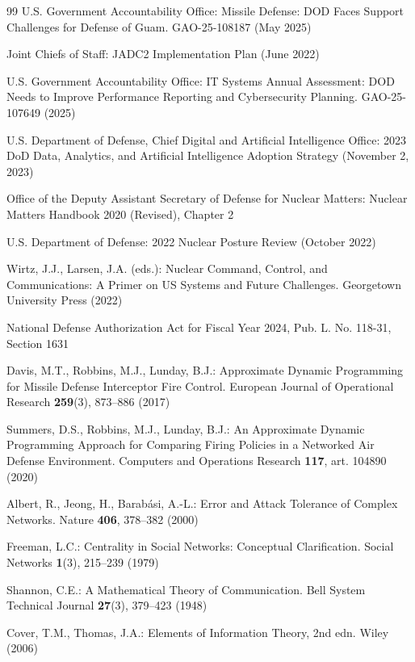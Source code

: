 \documentclass[runningheads]{llncs}
\begin{document}
\begin{thebibliography}{99}
 U.S. Government Accountability Office: Missile Defense: DOD Faces Support Challenges for Defense of Guam. GAO-25-108187 (May 2025)

 Joint Chiefs of Staff: JADC2 Implementation Plan (June 2022)

 U.S. Government Accountability Office: IT Systems Annual Assessment: DOD Needs to Improve Performance Reporting and Cybersecurity Planning. GAO-25-107649 (2025)

 U.S. Department of Defense, Chief Digital and Artificial Intelligence Office: 2023 DoD Data, Analytics, and Artificial Intelligence Adoption Strategy (November 2, 2023)

 Office of the Deputy Assistant Secretary of Defense for Nuclear Matters: Nuclear Matters Handbook 2020 (Revised), Chapter 2

 U.S. Department of Defense: 2022 Nuclear Posture Review (October 2022)

 Wirtz, J.J., Larsen, J.A. (eds.): Nuclear Command, Control, and Communications: A Primer on US Systems and Future Challenges. Georgetown University Press (2022)

 National Defense Authorization Act for Fiscal Year 2024, Pub. L. No. 118-31, Section 1631

 Davis, M.T., Robbins, M.J., Lunday, B.J.: Approximate Dynamic Programming for Missile Defense Interceptor Fire Control. European Journal of Operational Research \textbf{259}(3), 873--886 (2017)

 Summers, D.S., Robbins, M.J., Lunday, B.J.: An Approximate Dynamic Programming Approach for Comparing Firing Policies in a Networked Air Defense Environment. Computers and Operations Research \textbf{117}, art. 104890 (2020)

 Albert, R., Jeong, H., Barab\'{a}si, A.-L.: Error and Attack Tolerance of Complex Networks. Nature \textbf{406}, 378--382 (2000)

 Freeman, L.C.: Centrality in Social Networks: Conceptual Clarification. Social Networks \textbf{1}(3), 215--239 (1979)

 Shannon, C.E.: A Mathematical Theory of Communication. Bell System Technical Journal \textbf{27}(3), 379--423 (1948)

 Cover, T.M., Thomas, J.A.: Elements of Information Theory, 2nd edn. Wiley (2006)


\end{thebibliography}
\end{document}
